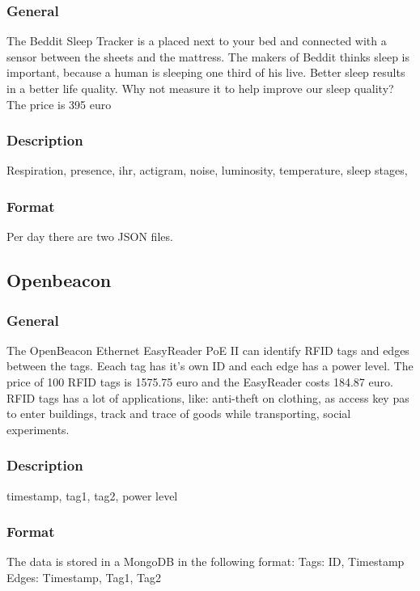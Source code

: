 		\subsubsection{General}
			The Beddit Sleep Tracker is a placed next to your bed and connected with a sensor between the sheets and the mattress. The makers of Beddit thinks sleep is important, because a human is sleeping one third of his live. Better sleep results in a better life quality. Why not measure it to help improve our sleep quality? 
			The price is 395 euro
			\subsubsection{Description}
				Respiration, presence, ihr, actigram, noise, luminosity, temperature, sleep stages, 
			\subsubsection{Format}
			Per day there are two JSON files.
			\lstset { 
				basicstyle = \footnotesize,
				tabsize = 2
			}


	\subsection{Openbeacon}
		\subsubsection{General}
			The OpenBeacon Ethernet EasyReader PoE II can identify RFID tags and edges between the tags. Eeach tag has it's own ID and each edge has a power level. The price of 100 RFID tags is 1575.75 euro and the EasyReader costs 184.87 euro. RFID tags has a lot of applications, like: anti-theft on clothing, as access key pas to enter buildings, track and trace of goods while transporting, social experiments.
		\subsubsection{Description}
		timestamp, tag1, tag2, power level

		\subsubsection{Format}
		The data is stored in a MongoDB in the following format:
		Tags: ID, Timestamp
		Edges: Timestamp, Tag1, Tag2
